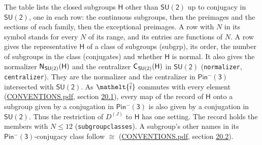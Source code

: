 \documentclass[10pt,a4paper]{article}
\numberwithin{equation}{section}
\newcommand{\eltfont}[1]{{\let\sigma\eltsigma\mathelt{#1}}}
\newcommand{\grp}[1]{\mathsf{#1}}
\newcommand{\elt}[1]{\eltfont{#1}}
\newcommand{\samecls}{\cong}
\newcommand{\irrJ}[1]{D^{(#1)}}
\newcommand{\lift}[1]{\tilde{#1}}
\newcommand{\hairsp}{\mkern1mu}
\begin{document}
\leavevmode\label{n:group.H}The table lists the closed subgroups $\grp{H}$ other than $\grp{SU(2)}$ up to conjugacy in $\grp{SU(2)}$, one in each row: the continuous subgroups, then the preimages and the sections of each family, then the exceptional preimages. A row with $N$ in its symbol stands for every $N$ of its range, and its entries are functions of $N$. \label{n:head.subgroup}\label{n:head.order}\label{n:head.conjugates}\label{n:head.normal}A row gives the representative $\grp{H}$ of a class of subgroups (subgrp), its order, the number of subgroups in the class (conjugates) and whether $\grp{H}$ is normal. \label{n:group.normalizer}\label{n:group.centralizer}It also gives the normalizer $\grp{N}_{\hairsp \grp{SU(2)}}(\grp{H})$ and the centralizer $\grp{C}_{\hairsp \grp{SU(2)}}(\grp{H})$ in $\grp{SU(2)}$ (\texttt{normalizer}, \texttt{centralizer}). They are the normalizer and the centralizer in \href{Pinminus3.pdf}{$\grp{Pin^{-}(3)}$} intersected with $\grp{SU(2)}$. As $\elt{\lift{i}}$ commutes with every element (\href{../../CONVENTIONS.pdf}{CONVENTIONS.pdf}, section \href{../../CONVENTIONS.pdf\#conv.20.1}{20.1}), every map of the record of $\grp{H}$ onto a subgroup given by a conjugation in \href{Pinminus3.pdf}{$\grp{Pin^{-}(3)}$} is also given by a conjugation in $\grp{SU(2)}$. Thus the restriction of $\irrJ{J}$ to $\grp{H}$ has one setting. The record holds the members with $N \le 12$ (\texttt{subgroupclasses}). A subgroup's other names in its \href{Pinminus3.pdf}{$\grp{Pin^{-}(3)}$}-conjugacy class follow $\samecls$ (\href{../../CONVENTIONS.pdf}{CONVENTIONS.pdf}, section \href{../../CONVENTIONS.pdf\#conv.20.2}{20.2}).
\end{document}
